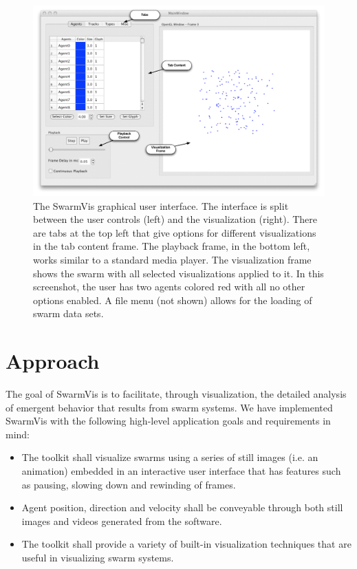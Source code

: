 \documentclass{vgtc}
\begin{document}
\begin{figure}[ht]
\centering
\includegraphics[scale=.45]{images/swarmvis-annotated.pdf}
\caption{The SwarmVis graphical user interface. 
The interface is split between the user controls (left) and the visualization (right).
There are tabs at the top left that give options for different visualizations in the tab content frame.
The playback frame, in the bottom left, works similar to a standard media player.
The visualization frame shows the swarm with all selected visualizations applied to it.
In this screenshot, the user has two agents colored red with all no other options enabled.
A file menu (not shown) allows for the loading of swarm data sets.}
\label{AnnotatedWindow}
\end{figure}

\section{Approach}
The goal of SwarmVis is to facilitate, through visualization, the detailed analysis of emergent behavior that results from swarm systems.
We have implemented SwarmVis
with the following high-level application goals and requirements in mind:
\begin{itemize}
\item The toolkit shall visualize swarms using a series of still images (i.e. an animation)
embedded in an interactive user interface that has features such as pausing, slowing down and rewinding of frames.
\item Agent position, direction and velocity shall be conveyable through both still images and videos generated from the software.
\item The toolkit shall provide a variety of built-in visualization techniques that are useful in visualizing swarm systems.
\end{itemize}
\end{document}
